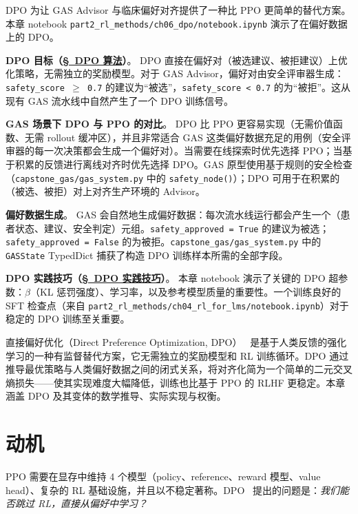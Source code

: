 \begin{keybox}
DPO 为让 GAS Advisor 与临床偏好对齐提供了一种比 PPO 更简单的替代方案。本章 notebook \texttt{part2\_rl\_methods/ch06\_dpo/notebook.ipynb} 演示了在偏好数据上的 DPO。

\textbf{DPO 目标（\hyperref[the-dpo-algorithm]{\S~DPO 算法}）}。
DPO 直接在偏好对（被选建议、被拒建议）上优化策略，无需独立的奖励模型。对于 GAS Advisor，偏好对由安全评审器生成：\texttt{safety\_score $\geq$ 0.7} 的建议为“被选”，\texttt{safety\_score < 0.7} 的为“被拒”。这从现有 GAS 流水线中自然产生了一个 DPO 训练信号。

\textbf{GAS 场景下 DPO 与 PPO 的对比}。
DPO 比 PPO 更容易实现（无需价值函数、无需 rollout 缓冲区），并且非常适合 GAS 这类偏好数据充足的用例（安全评审器的每一次决策都会生成一个偏好对）。当需要在线探索时优先选择 PPO；当基于积累的反馈进行离线对齐时优先选择 DPO。GAS 原型使用基于规则的安全检查（\texttt{capstone\_gas/gas\_system.py} 中的 \texttt{safety\_node()}）；DPO 可用于在积累的（被选、被拒）对上对齐生产环境的 Advisor。

\textbf{偏好数据生成}。
GAS 会自然地生成偏好数据：每次流水线运行都会产生一个（患者状态、建议、安全判定）元组。\texttt{safety\_approved = True} 的建议为被选；\texttt{safety\_approved = False} 的为被拒。\texttt{capstone\_gas/gas\_system.py} 中的 \texttt{GASState} TypedDict 捕获了构造 DPO 训练样本所需的全部字段。

\textbf{DPO 实践技巧（\hyperref[practical-dpo-tips]{\S~DPO 实践技巧}）}。
本章 notebook 演示了关键的 DPO 超参数：$\beta$（KL 惩罚强度）、学习率，以及参考模型质量的重要性。一个训练良好的 SFT 检查点（来自 \texttt{part2\_rl\_methods/ch04\_rl\_for\_lms/notebook.ipynb}）对于稳定的 DPO 训练至关重要。
\end{keybox}

直接偏好优化（Direct Preference Optimization, DPO）~\cite{rafailov2023direct} 是基于人类反馈的强化学习的一种有监督替代方案，它无需独立的奖励模型和 RL 训练循环。DPO 通过推导最优策略与人类偏好数据之间的闭式关系，将对齐化简为一个简单的二元交叉熵损失——使其实现难度大幅降低，训练也比基于 PPO 的 RLHF 更稳定。本章涵盖 DPO 及其变体的数学推导、实际实现与权衡。

\section{动机}
\label{motivation}

PPO 需要在显存中维持 4 个模型（policy、reference、reward 模型、value head）、复杂的 RL 基础设施，并且以不稳定著称。DPO~\cite{rafailov2023direct} 提出的问题是：\emph{我们能否跳过 RL，直接从偏好中学习？}

